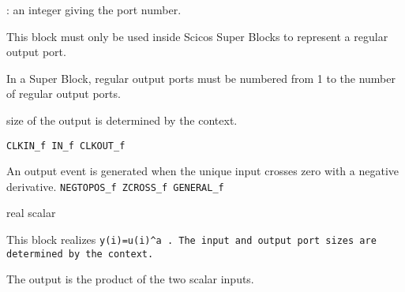 %
%


\label{OUTf}

\begin{scitem}
\item[{\verb?Port number?}]
: an integer giving the port number.
\end{scitem}%
This block must only be used inside Scicos Super Blocks to represent
a regular output port. 
\par\noindent
In a Super Block, regular output ports must be numbered from 1 to the
number of regular output ports.

size of the output is determined by the context.

{\verb?CLKIN_f IN_f CLKOUT_f?} \pageref{CLKINfINfCLKOUTf}
%
%


\label{POSTONEGf}

An output event is generated when the unique input crosses zero
with a negative derivative.
{\verb?NEGTOPOS_f ZCROSS_f GENERAL_f?} \pageref{NEGTOPOSfZCROSSfGENERALf}





%
%


\label{POWBLKf}

\begin{scitem}
\item[{\verb?a :?}]
real scalar
\end{scitem}%
This block realizes %
\tt y(i)=u(i)\^{}a%
\rm . The input and output port sizes
are determined by the context.
%
%


\label{PRODf}

The output is the product of the two scalar inputs.






